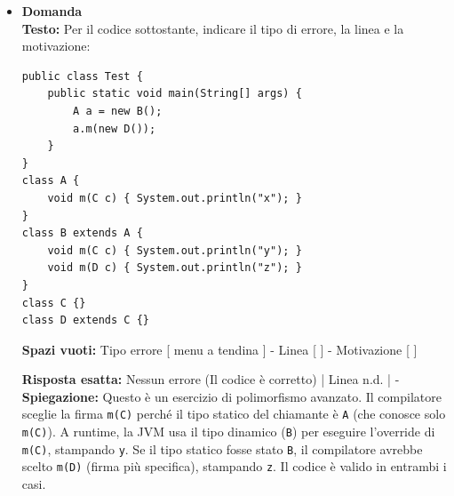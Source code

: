 \documentclass[12pt, a4paper]{article}
\begin{document}
\begin{itemize}
    \item {}\textbf{Domanda \thedomanda} \\
    \textbf{Testo:} Per il codice sottostante, indicare il tipo di errore, la linea e la motivazione:
\begin{verbatim}
public class Test {
    public static void main(String[] args) {
        A a = new B();
        a.m(new D());
    }
}
class A {
    void m(C c) { System.out.println("x"); }
}
class B extends A {
    void m(C c) { System.out.println("y"); }
    void m(D c) { System.out.println("z"); }
}
class C {}
class D extends C {}
\end{verbatim}
    \textbf{Spazi vuoti:} Tipo errore [ menu a tendina ] - Linea [ \hspace{1cm} ] - Motivazione [ \hspace{1cm} ] \\

\newpage
    
    \textbf{Risposta esatta:} Nessun errore (Il codice è corretto) | Linea n.d. | - \\
    \textbf{Spiegazione:} Questo è un esercizio di polimorfismo avanzato. Il compilatore sceglie la firma \texttt{m(C)} perché il tipo statico del chiamante è \texttt{A} (che conosce solo \texttt{m(C)}). A runtime, la JVM usa il tipo dinamico (\texttt{B}) per eseguire l'override di \texttt{m(C)}, stampando \texttt{y}. Se il tipo statico fosse stato \texttt{B}, il compilatore avrebbe scelto \texttt{m(D)} (firma più specifica), stampando \texttt{z}. Il codice è valido in entrambi i casi.
    \vspace{0.5cm}
\end{itemize}
\end{document}
